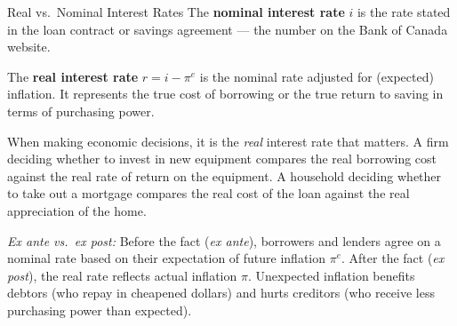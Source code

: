 \begin{defbox}{Real vs.\ Nominal Interest Rates}
The \textbf{nominal interest rate} $i$ is the rate stated in the
loan contract or savings agreement --- the number on the Bank of Canada
website.

The \textbf{real interest rate} $r = i - \pi^e$ is the nominal rate
adjusted for (expected) inflation. It represents the true cost of
borrowing or the true return to saving in terms of purchasing power.

When making economic decisions, it is the \textit{real} interest rate
that matters. A firm deciding whether to invest in new equipment
compares the real borrowing cost against the real rate of return on
the equipment. A household deciding whether to take out a mortgage
compares the real cost of the loan against the real appreciation of
the home.

\textit{Ex ante vs.\ ex post:} Before the fact (\textit{ex ante}),
borrowers and lenders agree on a nominal rate based on their expectation
of future inflation $\pi^e$. After the fact (\textit{ex post}), the real
rate reflects actual inflation $\pi$. Unexpected inflation benefits
debtors (who repay in cheapened dollars) and hurts creditors (who receive
less purchasing power than expected).
\end{defbox}

